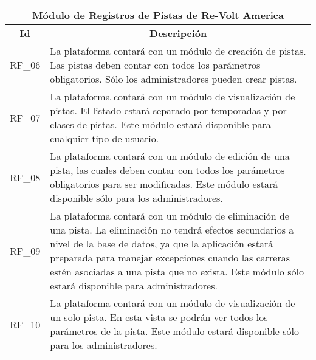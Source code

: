 \begin{center}
	\begin{tabular}{ | l | p{15cm} |}
		\hline
		\multicolumn{2}{|c|}{\textbf{Módulo de Registros de Pistas de Re-Volt America}} \\
		\hline
		\multicolumn{1}{|c|}{\textbf{Id}} & \multicolumn{1}{|c|}{\textbf{Descripción}} \\
		\hline
		RF\_06 & La plataforma contará con un módulo de creación de pistas. Las pistas deben contar con todos los parámetros obligatorios. Sólo los administradores pueden crear pistas. \\ \hline
		
		RF\_07 & La plataforma contará con un módulo de visualización de pistas. El listado estará separado por temporadas y por clases de pistas. Este módulo estará disponible para cualquier tipo de usuario. \\ \hline
		
		RF\_08 & La plataforma contará con un módulo de edición de una pista, las cuales deben contar con todos los parámetros obligatorios para ser modificadas. Este módulo estará disponible sólo para los administradores. \\ \hline
		
		RF\_09 & La plataforma contará con un módulo de eliminación de una pista. La eliminación no tendrá efectos secundarios a nivel de la base de datos, ya que la aplicación estará preparada para manejar excepciones cuando las carreras estén asociadas a una pista que no exista. Este módulo sólo estará disponible para administradores. \\ \hline
		
		RF\_10 & La plataforma contará con un módulo de visualización de un solo pista. En esta vista se podrán ver todos los parámetros de la pista. Este módulo estará disponible sólo para los administradores. \\ \hline
	\end{tabular}
\end{center}

